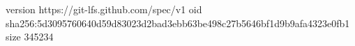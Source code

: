 version https://git-lfs.github.com/spec/v1
oid sha256:5d3095760640d59d83023d2bad3ebb63be498c27b5646bf1d9b9afa4323e0fb1
size 345234
